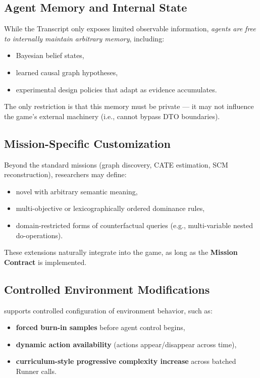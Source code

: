 \subsection{Agent Memory and Internal State}
While the Transcript only exposes limited observable information, \emph{agents are free to internally maintain arbitrary memory}, including:
\begin{itemize}
    \item Bayesian belief states,
    \item learned causal graph hypotheses,
    \item experimental design policies that adapt as evidence accumulates.
\end{itemize}
The only restriction is that this memory must be private — it may not influence the game’s external machinery (i.e., cannot bypass DTO boundaries).

\subsection{Mission-Specific Customization}
Beyond the standard missions (graph discovery, CATE estimation, SCM reconstruction), researchers may define:
\begin{itemize}
    \item novel \resultmetric{} with arbitrary semantic meaning,
    \item multi-objective or lexicographically ordered dominance rules,
    \item domain-restricted forms of counterfactual queries (e.g., multi-variable nested do-operations).
\end{itemize}
These extensions naturally integrate into the game, as long as the \textbf{Mission Contract} is implemented.

\subsection{Controlled Environment Modifications}
\game supports controlled configuration of environment behavior, such as:
\begin{itemize}
    \item \textbf{forced burn-in samples} before agent control begins,
    \item \textbf{dynamic action availability} (actions appear/disappear across time),
    \item \textbf{curriculum-style progressive complexity increase} across batched Runner calls.
\end{itemize}

